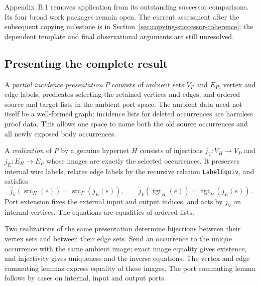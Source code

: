 Appendix~B.1 removes application from its outstanding successor comparisons.
Its four broad work packages remain open. The current assessment after the
subsequent copying milestone is in Section~\ref{sec:copying-successor-coherence};
the dependent template and final observational arguments are still unresolved.

\subsection{Presenting the complete result}

A \emph{partial incidence presentation} $P$ consists of ambient sets $V_P$ and
$E_P$, vertex and edge labels, predicates selecting the retained vertices and
edges, and ordered source and target lists in the ambient port space.
The ambient data need not itself be a well-formed graph: incidence lists for
deleted occurrences are harmless proof data. This allows one space to name
both the old source occurrences and all newly exposed body occurrences.


A \emph{realization} of $P$ by a genuine hypernet $H$ consists of injections
$j_V:V_H\to V_P$ and $j_E:E_H\to E_P$ whose images are exactly the selected
occurrences. It preserves internal wire labels, relates edge labels by the
recursive relation \texttt{LabelEquiv}, and satisfies
\[
\widehat j_V(\operatorname{src}_H(e))=\operatorname{src}_P(j_E(e)),\qquad
\widehat j_V(\operatorname{tgt}_H(e))=\operatorname{tgt}_P(j_E(e)).
\]
Port extension fixes the external input and output indices, and acts by $j_V$
on internal vertices. The equations are equalities of ordered lists.


Two realizations of the same presentation determine bijections between their
vertex sets and between their edge sets. Send an occurrence to the unique
occurrence with the same ambient image; exact image equality gives existence,
and injectivity gives uniqueness and the inverse equations. The vertex and
edge commuting lemmas express equality of these images. The port commuting
lemma follows by cases on internal, input and output ports.


